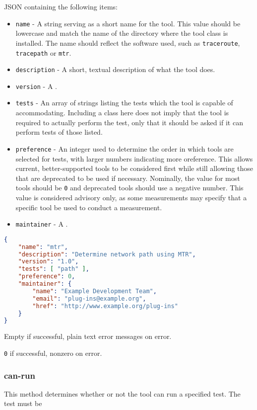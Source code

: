 \documentclass[10pt,titlepage]{article}
\begin{document}
 JSON containing the following items:
\begin{itemize}
\item{\tt name} - A string serving as a short name for the tool.  This
  value should be lowercase and match the name of the directory where
  the tool class is installed.  The name should reflect the software
  used, such as {\tt traceroute}, {\tt tracepath} or {\tt mtr}.
\item{\tt description} - A short, textual description of what the tool
  does.
\item{\tt version} - A .
\item{\tt tests} - An array of strings listing the tests which the
  tool is capable of accommodating.  Including a class here does not
  imply that the tool is required to actually perform the test, only
  that it should be asked if it can perform tests of those listed.
\item{\tt preference} - An integer used to determine the order in
  which tools are selected for tests, with larger numbers indicating
  more oreference.  This allows current, better-supported tools to be
  considered first while still allowing those that are deprecated to
  be used if necessary.  Nominally, the value for most tools should be
  {\tt 0} and deprecated tools should use a negative number.  This
  value is considered advisory only, as some measurements may specify
  that a specific tool be used to conduct a measurement.
\item{\tt maintainer} - A .
\end{itemize}

\example
\begin{lstlisting}[language=json,firstnumber=1]
{
    "name": "mtr",
    "description": "Determine network path using MTR",
    "version": "1.0",
    "tests": [ "path" ],
    "preference": 0,
    "maintainer": {
        "name": "Example Development Team",
        "email": "plug-ins@example.org",
        "href": "http://www.example.org/plug-ins"
    }
}
\end{lstlisting}

 Empty if successful, plain text error
messages on error.

 {\tt 0} if successful, nonzero on error.



\subsubsection{can-run}
This method determines whether or not the tool can run a specified test.  The test must be 
\end{document}
